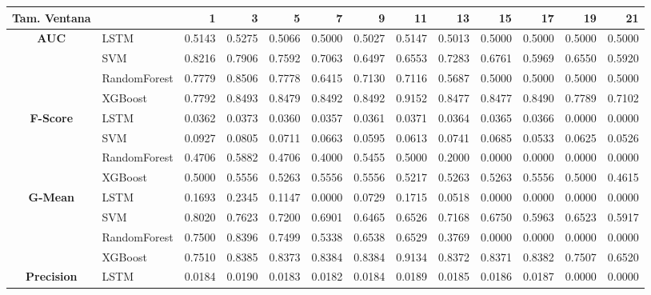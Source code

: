 \begin{table}[h]
	\centering
	\begin{adjustbox}{max width=15cm}
		\begin{tabular}{|c|l|r|r|r|r|r|r|r|r|r|r|r|}
			\hline
			\textbf{Tam. Ventana} &         &      1  &      3  &      5  &      7  &      9  &      11 &      13 &      15 &      17 &      19 &      21 \\
			\hline
			\textbf{AUC} & LSTM &  0.5143 &  0.5275 &  0.5066 &  0.5000 &  0.5027 &  0.5147 &  0.5013 &  0.5000 &  0.5000 &  0.5000 &  0.5000 \\
			& SVM &  0.8216 &  0.7906 &  0.7592 &  0.7063 &  0.6497 &  0.6553 &  0.7283 &  0.6761 &  0.5969 &  0.6550 &  0.5920 \\
			& RandomForest &  0.7779 &  0.8506 &  0.7778 &  0.6415 &  0.7130 &  0.7116 &  0.5687 &  0.5000 &  0.5000 &  0.5000 &  0.5000 \\
			& XGBoost &  0.7792 &  0.8493 &  0.8479 &  0.8492 &  0.8492 &  0.9152 &  0.8477 &  0.8477 &  0.8490 &  0.7789 &  0.7102 \\
			\hline
			\textbf{F-Score} & LSTM &  0.0362 &  0.0373 &  0.0360 &  0.0357 &  0.0361 &  0.0371 &  0.0364 &  0.0365 &  0.0366 &  0.0000 &  0.0000 \\
			& SVM &  0.0927 &  0.0805 &  0.0711 &  0.0663 &  0.0595 &  0.0613 &  0.0741 &  0.0685 &  0.0533 &  0.0625 &  0.0526 \\
			& RandomForest &  0.4706 &  0.5882 &  0.4706 &  0.4000 &  0.5455 &  0.5000 &  0.2000 &  0.0000 &  0.0000 &  0.0000 &  0.0000 \\
			& XGBoost &  0.5000 &  0.5556 &  0.5263 &  0.5556 &  0.5556 &  0.5217 &  0.5263 &  0.5263 &  0.5556 &  0.5000 &  0.4615 \\
			\hline
			\textbf{G-Mean} & LSTM &  0.1693 &  0.2345 &  0.1147 &  0.0000 &  0.0729 &  0.1715 &  0.0518 &  0.0000 &  0.0000 &  0.0000 &  0.0000 \\
			& SVM &  0.8020 &  0.7623 &  0.7200 &  0.6901 &  0.6465 &  0.6526 &  0.7168 &  0.6750 &  0.5963 &  0.6523 &  0.5917 \\
			& RandomForest &  0.7500 &  0.8396 &  0.7499 &  0.5338 &  0.6538 &  0.6529 &  0.3769 &  0.0000 &  0.0000 &  0.0000 &  0.0000 \\
			& XGBoost &  0.7510 &  0.8385 &  0.8373 &  0.8384 &  0.8384 &  0.9134 &  0.8372 &  0.8371 &  0.8382 &  0.7507 &  0.6520 \\
			\hline
			\textbf{Precision} & LSTM &  0.0184 &  0.0190 &  0.0183 &  0.0182 &  0.0184 &  0.0189 &  0.0185 &  0.0186 &  0.0187 &  0.0000 &  0.0000 \\

\end{tabular}
\end{adjustbox}
\end{table}
